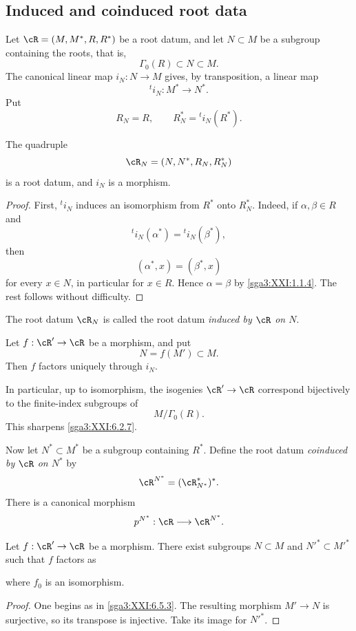 \subsection{Induced and coinduced root data}\label{sga3:XXI:6.5}

Let \(\cR=(M,M^\ast,R,R^\ast)\) be a root datum, and let
\(N\subset M\) be a subgroup containing the roots, that is,
\[
 \Gamma_0(R)\subset N\subset M.
\]
The canonical linear map \(i_N:N\to M\) gives, by transposition, a
linear map
\[
 {}^ti_N:M^\ast\longrightarrow N^\ast.
\]
Put
\[
 R_N=R,
 \qquad
 R_N^\ast={}^ti_N(R^\ast).
\]

\begin{lemma}\label{sga3:XXI:6.5.1}
The quadruple
\[
 \cR_N=(N,N^\ast,R_N,R_N^\ast)
\]
is a root datum, and \(i_N\) is a morphism.
\end{lemma}

\begin{proof}
First, \({}^ti_N\) induces an isomorphism from \(R^\ast\) onto
\(R_N^\ast\). Indeed, if \(\alpha,\beta\in R\) and
\[
 {}^ti_N(\alpha^\ast)={}^ti_N(\beta^\ast),
\]
then
\[
 (\alpha^\ast,x)=(\beta^\ast,x)
\]
for every \(x\in N\), in particular for \(x\in R\). Hence
\(\alpha=\beta\) by \ref{sga3:XXI:1.1.4}. The rest follows without
difficulty.
\end{proof}

\begin{definition}\label{sga3:XXI:6.5.2}
The root datum \(\cR_N\) is called the root datum
\emph{induced by \(\cR\) on \(N\)}.
\end{definition}

\begin{lemma}\label{sga3:XXI:6.5.3}
Let \(f:\cR'\to\cR\) be a morphism, and put
\[
 N=f(M')\subset M.
\]
Then \(f\) factors uniquely through \(i_N\).
\end{lemma}

In particular, up to isomorphism, the isogenies
\(\cR'\to\cR\) correspond bijectively to the finite-index subgroups of
\[
 M/\Gamma_0(R).
\]
This sharpens \ref{sga3:XXI:6.2.7}.

Now let \(N^\ast\subset M^\ast\) be a subgroup containing \(R^\ast\).
Define the root datum \emph{coinduced by \(\cR\) on \(N^\ast\)} by
\[
 \cR^{N^\ast}=(\cR^\ast_{N^\ast})^\ast.
\]
There is a canonical morphism
\[
 p^{N^\ast}:\cR\longrightarrow\cR^{N^\ast}.
\]

\begin{lemma}\label{sga3:XXI:6.5.4}
Let \(f:\cR'\to\cR\) be a morphism. There exist subgroups
\(N\subset M\) and \(N'^\ast\subset M'^\ast\) such that \(f\) factors
as
\begin{center}
\end{center}
where \(f_0\) is an isomorphism.
\end{lemma}

\begin{proof}
One begins as in \ref{sga3:XXI:6.5.3}. The resulting morphism
\(M'\to N\) is surjective, so its transpose is injective. Take its
image for \(N'^\ast\).
\end{proof}

